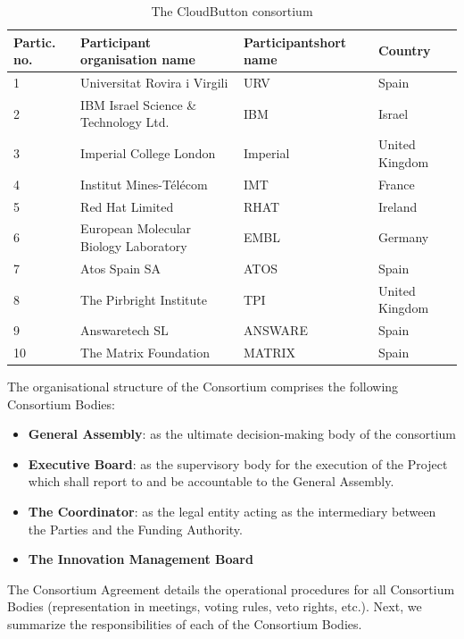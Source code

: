 \documentclass[a4paper,11pt]{article}
\begin{document}
{
\def\arraystretch{1.5}
\begin{table}[htbp]
\caption{The CloudButton consortium}
\label{tab:consortium}
\begin{tabular}{ |p{1.5cm} | p{} | p{2.46cm} | l | }
\hline
\rowcolor[gray]{.8} \textbf{Partic. no.} & \textbf{Participant organisation name} &
  \textbf{Participant\newline short name} & \textbf{Country} \\ \hline
1 & Universitat Rovira i Virgili & URV & Spain \\ \hline
2 & IBM Israel Science \& Technology Ltd. & IBM & Israel \\ \hline
3 & Imperial College London & Imperial & United Kingdom \\ \hline
4 & Institut Mines-Télécom & IMT & France \\ \hline
5 & Red Hat Limited & RHAT & Ireland \\ \hline
6 & European Molecular Biology Laboratory  & EMBL & Germany \\ \hline
7 & Atos Spain SA & ATOS & Spain  \\ \hline
8 & The Pirbright Institute & TPI & United Kingdom  \\ \hline
9 & Answaretech SL & ANSWARE & Spain \\ \hline
10 & The Matrix Foundation & MATRIX & Spain \\ \hline
\end{tabular}
\end{table}
}

The organisational structure of the Consortium comprises the following Consortium Bodies:

\begin{itemize}
\item \textbf{General Assembly}: as the ultimate decision-making body of the consortium
\item \textbf{Executive Board}: as the supervisory body for the execution of the Project which shall report to and be accountable to the General Assembly.
\item \textbf{The Coordinator}: as the legal entity acting as the intermediary between the Parties and the Funding Authority.
\item \textbf{The Innovation Management Board}
\end{itemize}

The Consortium Agreement details the operational procedures for all Consortium Bodies (representation in meetings, voting rules, veto rights, etc.). Next, we summarize the responsibilities of each of the Consortium Bodies.
\end{document}
